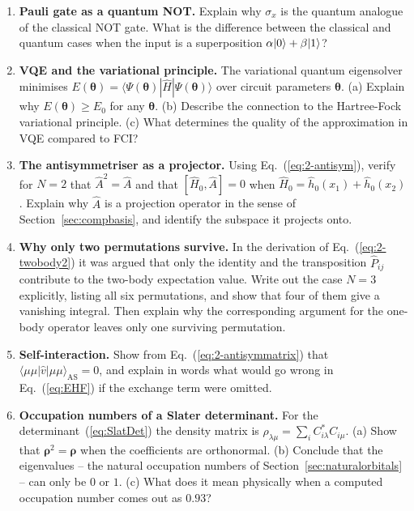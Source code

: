 \begin{enumerate}
\item \textbf{Pauli gate as a quantum NOT.}
  Explain why $\sigma_x$ is the quantum analogue of the classical NOT
  gate.  What is the difference between the classical and quantum
  cases when the input is a superposition
  $\alpha\vert 0 \rangle+\beta\vert 1 \rangle$?

\item \textbf{VQE and the variational principle.}
  The variational quantum eigensolver minimises
  $E(\bm{\theta})=\langle\Psi(\bm{\theta})|\hat{H}|\Psi(\bm{\theta})\rangle$
  over circuit parameters $\bm{\theta}$.
  (a) Explain why $E(\bm{\theta})\geq E_0$ for any $\bm{\theta}$.
  (b) Describe the connection to the Hartree-Fock variational principle.
  (c) What determines the quality of the approximation in VQE
      compared to FCI?


\item \textbf{The antisymmetriser as a projector.}
  Using Eq.~(\ref{eq:2-antisym}), verify for $N=2$ that
  $\hat{A}^2=\hat{A}$ and that $[\hat{H}_0,\hat{A}]=0$ when
  $\hat{H}_0=\hat{h}_0(x_1)+\hat{h}_0(x_2)$.  Explain why
  $\hat{A}$ is a projection operator in the sense of
  Section~\ref{sec:compbasis}, and identify the subspace it projects onto.

\item \textbf{Why only two permutations survive.}
  In the derivation of Eq.~(\ref{eq:2-twobody2}) it was argued that only the
  identity and the transposition $\hat{P}_{ij}$ contribute to the two-body
  expectation value.  Write out the case $N=3$ explicitly, listing all six
  permutations, and show that four of them give a vanishing integral.
  Then explain why the corresponding argument for the one-body operator
  leaves only one surviving permutation.

\item \textbf{Self-interaction.}
  Show from Eq.~(\ref{eq:2-antisymmatrix}) that
  $\langle\mu\mu|\hat{v}|\mu\mu\rangle_{\mathrm{AS}}=0$, and explain in words
  what would go wrong in Eq.~(\ref{eq:EHF}) if the exchange term were omitted.

\item \textbf{Occupation numbers of a Slater determinant.}
  For the determinant~(\ref{eq:SlatDet}) the density matrix is
  $\rho_{\lambda\mu}=\sum_{i}C^{*}_{i\lambda}C_{i\mu}$.
  (a) Show that $\bm{\rho}^2=\bm{\rho}$ when the coefficients are orthonormal.
  (b) Conclude that the eigenvalues -- the natural occupation numbers of
      Section~\ref{sec:naturalorbitals} -- can only be $0$ or $1$.
  (c) What does it mean physically when a computed occupation number comes
      out as $0.93$?


\end{enumerate}
